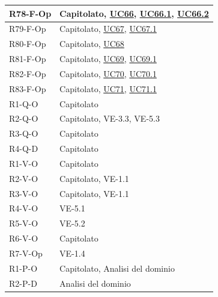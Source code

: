 \begin{longtable}{|p{2.8cm}|p{10.2cm}|}
	R78-F-Op & Capitolato, \hyperlink{uc66}{UC66}, \hyperlink{uc66.1}{UC66.1}, \hyperlink{uc66.2}{UC66.2} \\ \hline
	R79-F-Op & Capitolato, \hyperlink{uc67}{UC67}, \hyperlink{uc67.1}{UC67.1} \\ \hline
	R80-F-Op & Capitolato, \hyperlink{uc68}{UC68} \\ \hline
	R81-F-Op & Capitolato, \hyperlink{uc69}{UC69}, \hyperlink{uc69.1}{UC69.1} \\ \hline
	R82-F-Op & Capitolato, \hyperlink{uc70}{UC70}, \hyperlink{uc70.1}{UC70.1} \\ \hline
	R83-F-Op & Capitolato, \hyperlink{uc71}{UC71}, \hyperlink{uc71.1}{UC71.1} \\ \hline
	R1-Q-O  & Capitolato \\ \hline
	R2-Q-O  & Capitolato, VE-3.3, VE-5.3 \\ \hline
	R3-Q-O  & Capitolato \\ \hline
	R4-Q-D  & Capitolato \\ \hline
	R1-V-O  & Capitolato \\ \hline
	R2-V-O  & Capitolato, VE-1.1 \\ \hline
	R3-V-O  & Capitolato, VE-1.1 \\ \hline
	R4-V-O  & VE-5.1 \\ \hline
	R5-V-O  & VE-5.2 \\ \hline
	R6-V-O  & Capitolato \\ \hline
	R7-V-Op & VE-1.4 \\ \hline
	R1-P-O  & Capitolato, Analisi del dominio \\ \hline
	R2-P-D  & Analisi del dominio \\ \hline

\end{longtable}


